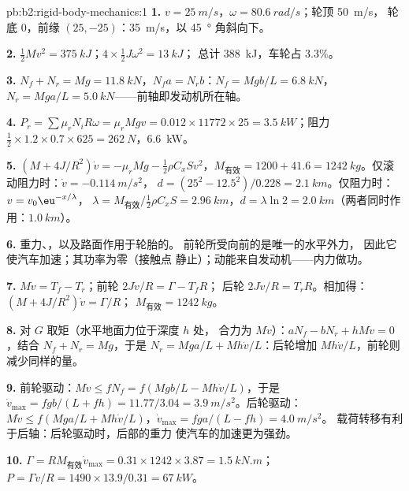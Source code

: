 \begin{solution}{pb:b2:rigid-body-mechanics:1}
\textbf{1.} $v = \qty{25}{m/s}$，$\omega = \qty{80.6}{rad/s}$；轮顶 \qty{50}{m/s}，
轮底 $0$，前缘 $(25, -25)$：\qty{35}{m/s}，以 \qty{45}{\degree} 角斜向下。

\textbf{2.} $\tfrac12Mv^2 = \qty{375}{kJ}$；$4 \times \tfrac12J\omega^2 = \qty{13}{kJ}$；
总计 \qty{388}{kJ}，车轮占 $3.3\%$。

\textbf{3.} $N_f + N_r = Mg = \qty{11.8}{kN}$，$N_fa = N_rb$：$N_f = Mgb/L =
\qty{6.8}{kN}$，$N_r = Mga/L = \qty{5.0}{kN}$——前轴即发动机所在轴。

\textbf{4.} $P_r = \sum\mu_rN_iR\omega = \mu_rMgv = 0.012 \times 11772 \times 25 =
\qty{3.5}{kW}$；阻力 $\tfrac12 \times 1.2 \times 0.7 \times 625 = \qty{262}{N}$，\qty{6.6}{kW}。

\textbf{5.} $(M + 4J/R^2)\dot v = -\mu_rMg - \tfrac12\rho C_xSv^2$，$M_{\text{有效}} =
1200 + 41.6 = \qty{1242}{kg}$。仅滚动阻力时：$\dot v = \qty{-0.114}{m/s^2}$，
$d = (25^2 - 12.5^2)/0.228 = \qty{2.1}{km}$。仅阻力时：$v = v_0\eu^{-x/\lambda}$，
$\lambda = M_{\text{有效}}/\tfrac12\rho C_xS = \qty{2.96}{km}$，$d = \lambda\ln2 =
\qty{2.0}{km}$（两者同时作用：$\qty{1.0}{km}$）。

\textbf{6.} 重力、，以及路面作用于轮胎的。
前轮所受向前的是唯一的水平外力，
因此它使汽车加速；其功率为零（接触点
静止）；动能来自发动机——内力做功。

\textbf{7.} $M\dot v = T_f - T_r$；前轮 $2J\dot v/R = \Gamma - T_fR$；
后轮 $2J\dot v/R = T_rR$。相加得：$(M + 4J/R^2)\dot v = \Gamma/R$；
$M_{\text{有效}} = \qty{1242}{kg}$。

\textbf{8.} 对 $G$ 取矩（水平地面力位于深度 $h$ 处，
合力为 $M\dot v$）：$aN_f - bN_r + hM\dot v = 0$，结合 $N_f + N_r = Mg$，于是
$N_r = Mga/L + Mh\dot v/L$：后轮增加 $Mh\dot v/L$，前轮则减少同样的量。

\textbf{9.} 前轮驱动：$M\dot v \le fN_f = f(Mgb/L - Mh\dot v/L)$，于是
$\dot v_{\max} = fgb/(L + fh) = 11.77/3.04 = \qty{3.9}{m/s^2}$。后轮驱动：
$M\dot v \le f(Mga/L + Mh\dot v/L)$，$\dot v_{\max} = fga/(L - fh) = \qty{4.0}{m/s^2}$。
载荷转移有利于后轴：后轮驱动时，后部的重力
使汽车的加速更为强劲。

\textbf{10.} $\Gamma = RM_{\text{有效}}\dot v_{\max} = 0.31 \times 1242 \times 3.87 =
\qty{1.5}{kN.m}$；$P = \Gamma v/R = 1490 \times 13.9/0.31 = \qty{67}{kW}$。


\end{solution}
